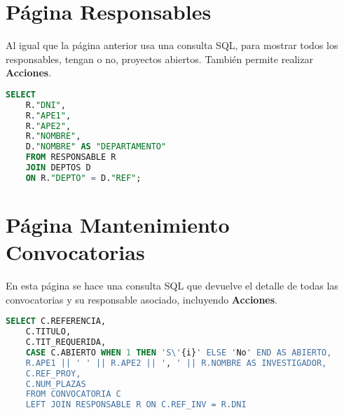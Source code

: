 \section{Página Responsables}
Al igual que la página anterior usa una consulta \acrshort{SQL}, para mostrar todos los responsables, tengan o no, proyectos abiertos. También permite realizar \textbf{Acciones}.
\begin{lstlisting}[language=SQL, caption={Informe de todos los Responsables}]
	SELECT 
	R."DNI", 
	R."APE1",
	R."APE2",
	R."NOMBRE",
	D."NOMBRE" AS "DEPARTAMENTO"
	FROM RESPONSABLE R
	JOIN DEPTOS D
	ON R."DEPTO" = D."REF";
\end{lstlisting}

\section{Página Mantenimiento Convocatorias}
En esta página se hace una consulta \acrshort{SQL} que devuelve el detalle de todas las convocatorias y su responsable asociado, incluyendo \textbf{Acciones}.
\begin{lstlisting}[language=SQL, caption={Informe de todas las Convocatorias}]
	SELECT C.REFERENCIA,
	C.TITULO,
	C.TIT_REQUERIDA,
	CASE C.ABIERTO WHEN 1 THEN 'S\'{i}' ELSE 'No' END AS ABIERTO,
	R.APE1 || ' ' || R.APE2 || ', ' || R.NOMBRE AS INVESTIGADOR,
	C.REF_PROY,
	C.NUM_PLAZAS
	FROM CONVOCATORIA C
	LEFT JOIN RESPONSABLE R ON C.REF_INV = R.DNI
\end{lstlisting}
